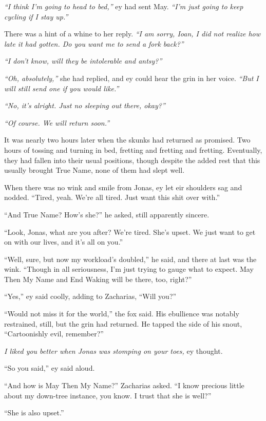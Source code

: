 \emph{``I think I'm going to head to bed,''} ey had sent May. \emph{``I'm just going to keep cycling if I stay up.''}

There was a hint of a whine to her reply. \emph{``I am sorry, Ioan, I did not realize how late it had gotten. Do you want me to send a fork back?''}

\emph{``I don't know, will they be intolerable and antsy?''}

\emph{``Oh, absolutely,''} she had replied, and ey could hear the grin in her voice. \emph{``But I will still send one if you would like.''}

\emph{``No, it's alright. Just no sleeping out there, okay?''}

\emph{``Of course. We will return soon.''}

It was nearly two hours later when the skunks had returned as promised. Two hours of tossing and turning in bed, fretting and fretting and fretting. Eventually, they had fallen into their usual positions, though despite the added rest that this usually brought True Name, none of them had slept well.

When there was no wink and smile from Jonas, ey let eir shoulders sag and nodded. ``Tired, yeah. We're all tired. Just want this shit over with.''

``And True Name? How's she?'' he asked, still apparently sincere.

``Look, Jonas, what are you after? We're tired. She's upset. We just want to get on with our lives, and it's all on you.''

``Well, sure, but now my workload's doubled,'' he said, and there at last was the wink. ``Though in all seriousness, I'm just trying to gauge what to expect. May Then My Name and End Waking will be there, too, right?''

``Yes,'' ey said coolly, adding to Zacharias, ``Will you?''

``Would not miss it for the world,'' the fox said. His ebullience was notably restrained, still, but the grin had returned. He tapped the side of his snout, ``Cartoonishly evil, remember?''

\emph{I liked you better when Jonas was stomping on your toes,} ey thought.

``So you said,'' ey said aloud.

``And how is May Then My Name?'' Zacharias asked. ``I know precious little about my down-tree instance, you know. I trust that she is well?''

``She is also upset.''

